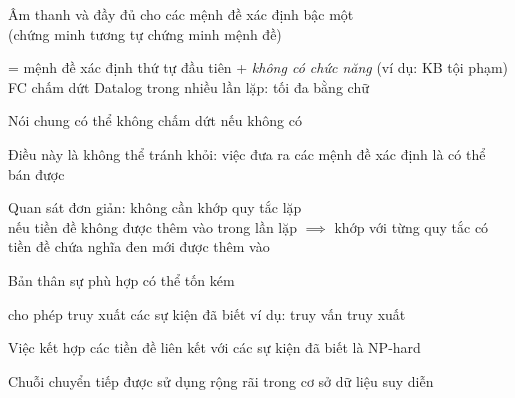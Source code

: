 \documentclass{article}
\begin{document}
\begin{huge}
Âm thanh và đầy đủ cho các mệnh đề xác định bậc một\\
(chứng minh tương tự chứng minh mệnh đề)

 = mệnh đề xác định thứ tự đầu tiên + \emph{không có chức năng} (ví dụ: KB tội phạm)\\
FC chấm dứt Datalog trong nhiều lần lặp: tối đa  bằng chữ

Nói chung có thể không chấm dứt nếu không có \mat{$\alpha$}

Điều này là không thể tránh khỏi: việc đưa ra các mệnh đề xác định là có thể bán được


Quan sát đơn giản: không cần khớp quy tắc lặp \\
nếu tiền đề không được thêm vào trong lần lặp \nl
$\implies$ khớp với từng quy tắc có tiền đề chứa nghĩa đen mới được thêm vào

Bản thân sự phù hợp có thể tốn kém

 cho phép  truy xuất các sự kiện đã biết\al
ví dụ: truy vấn  truy xuất 

Việc kết hợp các tiền đề liên kết với các sự kiện đã biết là NP-hard

Chuỗi chuyển tiếp được sử dụng rộng rãi trong cơ sở dữ liệu suy diễn 


\begin{minipage}[c]{0.42\maxfigwidth}
\maxfigwidth
\centerline{  }
\end{minipage}%
\hfill
\begin{minipage}[c]{0.58\maxfigwidth}
\noindent 
\tab{}
\\[4pt]
\tab\tab\tab{}
\\[4pt]
\tab\tab\tab{}
\\[4pt]
\tab\tab\tab{}
\\[4pt]
\tab\tab\tab{}
\\[8 điểm]
\tab{}
\\[4pt]
\tab{}
\\[4pt]
\tab{}
\end{minipage}


\end{huge}
\end{document}
